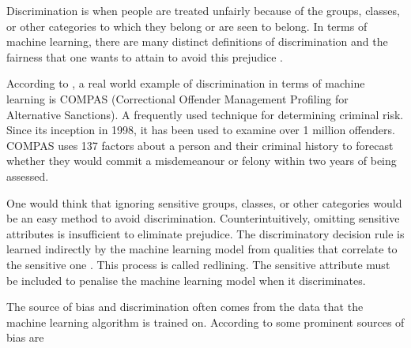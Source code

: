 Discrimination is when people are treated unfairly because of the groups, classes, or other categories to which they belong or are seen to belong. In terms of machine learning, there are many distinct definitions of discrimination \citep{Altman:2011:doc} and the fairness that one wants to attain to avoid this prejudice \citep{Binns:2018:PMLR}.

According to \citet{Dressel:2018:AAAS}, a real world example of discrimination in terms of machine learning is COMPAS (Correctional Offender Management Profiling for Alternative Sanctions). A frequently used technique for determining criminal risk. Since its inception in 1998, it has been used to examine over 1 million offenders. COMPAS uses 137 factors about a person and their criminal history to forecast whether they would commit a misdemeanour or felony within two years of being assessed.

One would think that ignoring sensitive groups, classes, or other categories would be an easy method to avoid discrimination. Counterintuitively, omitting sensitive attributes is insufficient to eliminate prejudice. The discriminatory decision rule is learned indirectly by the machine learning model from qualities that correlate to the sensitive one \citep{Dressel:2018:AAAS, Calders:20210:DMKD}. This process is called redlining. The sensitive attribute must be included to penalise the machine learning model when it discriminates.

The source of bias and discrimination often comes from the data that the machine learning algorithm is trained on. According to \citet{Mehrabi:2021:CSUR} some prominent sources of bias are

